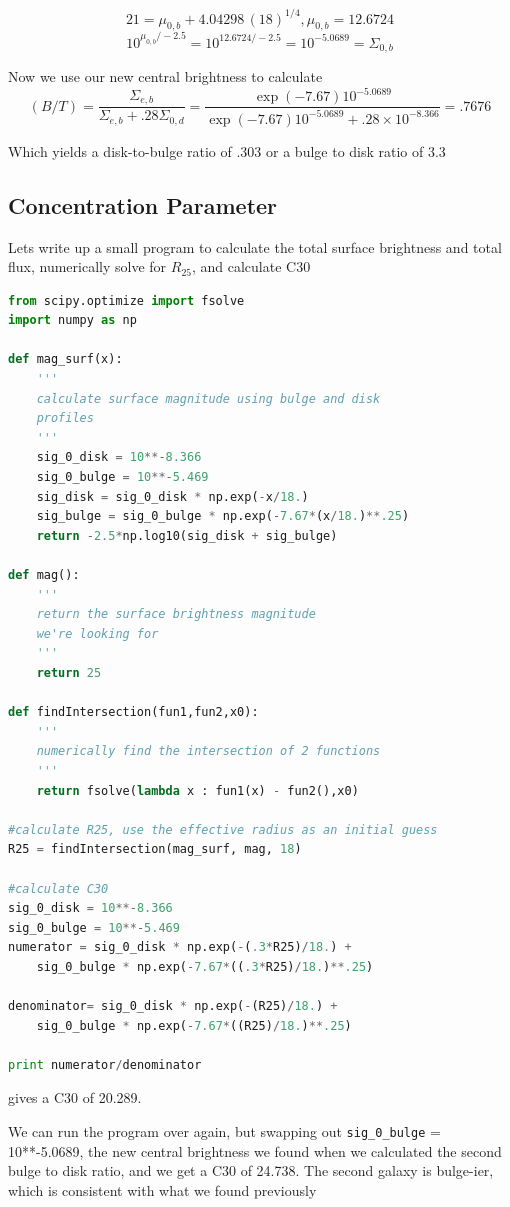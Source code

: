 \documentclass[12pt]{article}
\begin{document}
$$ 21 = \mu_{0,b} + 4.04298 \, (18)^{1/4}, \mu_{0,b} = 12.6724  $$
$$ 10^{\mu_{0,b}/-2.5} = 10^{12.6724/-2.5} =  10^{-5.0689}= \Sigma_{0,b}$$

Now we use our new central brightness to calculate 
$$(B/T) = \frac{\Sigma_{e,b}}{\Sigma_{e,b}  + .28 \Sigma_{0,d}} = \frac{\exp(-7.67)10^{-5.0689}}{\exp(-7.67)10^{-5.0689}  + .28 \times10^{-8.366}} = .7676$$

Which yields a disk-to-bulge ratio of .303 or a bulge to disk ratio of 3.3

\subsection{Concentration Parameter}
Lets write up a small program to calculate the total surface brightness and total flux, numerically solve for $R_{25}$, and calculate C30

\begin{lstlisting}[language=Python]
from scipy.optimize import fsolve
import numpy as np

def mag_surf(x):
    '''
    calculate surface magnitude using bulge and disk 
    profiles
    '''
    sig_0_disk = 10**-8.366
    sig_0_bulge = 10**-5.469
    sig_disk = sig_0_disk * np.exp(-x/18.)
    sig_bulge = sig_0_bulge * np.exp(-7.67*(x/18.)**.25)
    return -2.5*np.log10(sig_disk + sig_bulge)

def mag():
    '''
    return the surface brightness magnitude 
    we're looking for
    '''
    return 25

def findIntersection(fun1,fun2,x0):
    '''
    numerically find the intersection of 2 functions
    '''
    return fsolve(lambda x : fun1(x) - fun2(),x0)

#calculate R25, use the effective radius as an initial guess
R25 = findIntersection(mag_surf, mag, 18)

#calculate C30
sig_0_disk = 10**-8.366
sig_0_bulge = 10**-5.469
numerator = sig_0_disk * np.exp(-(.3*R25)/18.) + 
	sig_0_bulge * np.exp(-7.67*((.3*R25)/18.)**.25)

denominator= sig_0_disk * np.exp(-(R25)/18.) + 
	sig_0_bulge * np.exp(-7.67*((R25)/18.)**.25)

print numerator/denominator
\end{lstlisting}
gives a C30 of 20.289.

We can run the program over again, but swapping out \texttt{sig\_0\_bulge} =  10**-5.0689, the new central brightness we found when we calculated the second bulge to disk ratio, and we get a C30 of 24.738. The second galaxy is bulge-ier, which is consistent with what we found previously
\end{document}
